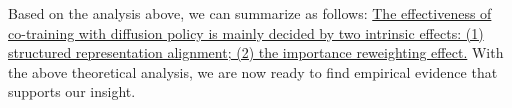 Based on the analysis above, we can summarize as follows:
\uline{{The effectiveness of} co-training with diffusion policy is mainly decided by two intrinsic effects:
(1) structured representation alignment; (2) the importance reweighting effect.}
With the above theoretical analysis, we are now ready to find empirical evidence that supports our insight.
